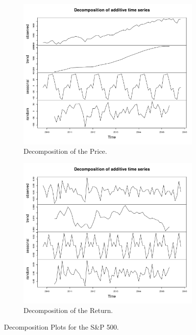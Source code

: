 \documentclass[10pt]{article_simple}
\begin{document}
\begin{figure}[H]
\centering
	\begin{subfigure}{.45\textwidth}
  	\centering
  	\includegraphics[width=.95\linewidth]{Decompsition_pr.png}
  	\caption{Decomposition of the Price.}
	\end{subfigure}%
	\hspace{1em}
	\begin{subfigure}{.45\textwidth}
  	\centering
  	\includegraphics[width=.95\linewidth]{Decompsition_re.png}
  	\caption{Decomposition of the Return.}
	\end{subfigure}
	\caption{Decomposition Plots for the S\&P 500.}
\end{figure}
\end{document}
